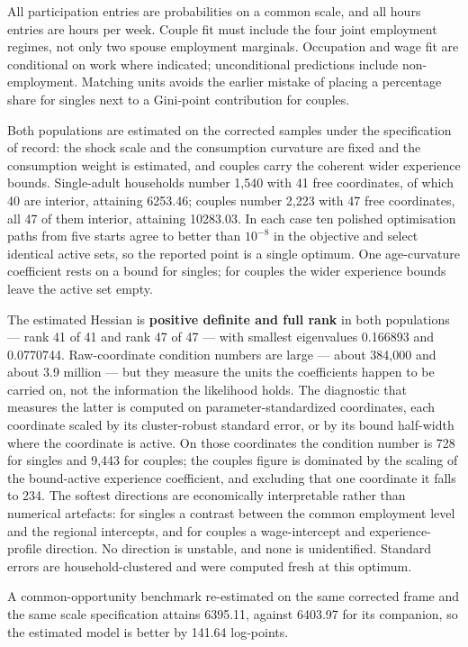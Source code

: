 \documentclass[11pt,a4paper]{article}
\begin{document}
All participation entries are probabilities on a common scale, and all hours entries are hours per week. Couple fit must include the four joint employment regimes, not only two spouse employment marginals. Occupation and wage fit are conditional on work where indicated; unconditional predictions include non-employment. Matching units avoids the earlier mistake of placing a percentage share for singles next to a Gini-point contribution for couples.

Both populations are estimated on the corrected samples under the specification of record: the shock scale and the consumption curvature are fixed and the consumption weight is estimated, and couples carry the coherent wider experience bounds. Single-adult households number 1,540 with 41 free coordinates, of which 40 are interior, attaining 6253.46; couples number 2,223 with 47 free coordinates, all 47 of them interior, attaining 10283.03. In each case ten polished optimisation paths from five starts agree to better than \(10^{-8}\) in the objective and select identical active sets, so the reported point is a single optimum. One age-curvature coefficient rests on a bound for singles; for couples the wider experience bounds leave the active set empty.

The estimated Hessian is \textbf{positive definite and full rank} in both populations --- rank 41 of 41 and rank 47 of 47 --- with smallest eigenvalues 0.166893 and 0.0770744. Raw-coordinate condition numbers are large --- about 384,000 and about 3.9 million --- but they measure the units the coefficients happen to be carried on, not the information the likelihood holds. The diagnostic that measures the latter is computed on parameter-standardized coordinates, each coordinate scaled by its cluster-robust standard error, or by its bound half-width where the coordinate is active. On those coordinates the condition number is 728 for singles and 9,443 for couples; the couples figure is dominated by the scaling of the bound-active experience coefficient, and excluding that one coordinate it falls to 234. The softest directions are economically interpretable rather than numerical artefacts: for singles a contrast between the common employment level and the regional intercepts, and for couples a wage-intercept and experience-profile direction. No direction is unstable, and none is unidentified. Standard errors are household-clustered and were computed fresh at this optimum.

A common-opportunity benchmark re-estimated on the same corrected frame and the same scale specification attains 6395.11, against 6403.97 for its companion, so the estimated model is better by 141.64 log-points.
\end{document}
